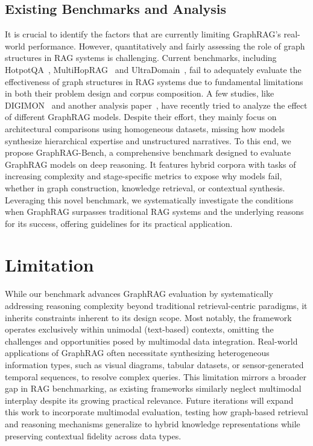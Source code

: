 \documentclass{article} %
\begin{document}
\subsection{Existing Benchmarks and Analysis}
It is crucial to identify the factors that are currently limiting GraphRAG's real-world performance.
However, quantitatively and fairly assessing the role of graph structures in RAG systems is challenging.
Current benchmarks, including HotpotQA~\citep{yang2018hotpotqa}, MultiHopRAG~\citep{tang2024multihop} and UltraDomain~\citep{qian2024memorag}, fail to adequately evaluate the effectiveness of graph structures in RAG systems due to fundamental limitations in both their problem design and corpus composition. A few studies, like DIGIMON~\citep{zhou2025depth} and another analysis paper~\citep {han2025rag}, have recently tried to analyze the effect of different GraphRAG models. Despite their effort, they mainly focus on architectural comparisons using homogeneous datasets, missing how models synthesize hierarchical expertise and unstructured narratives. To this end, we propose GraphRAG-Bench, a comprehensive benchmark designed to evaluate GraphRAG models on deep reasoning.  It features hybrid corpora with tasks of increasing complexity and stage-specific metrics to expose why models fail, whether in graph construction, knowledge retrieval, or contextual synthesis.
Leveraging this novel benchmark, we systematically investigate the conditions when GraphRAG surpasses traditional RAG systems and the underlying reasons for its success, offering guidelines for its practical application. 

\section{Limitation}
While our benchmark advances GraphRAG evaluation by systematically addressing reasoning complexity beyond traditional retrieval-centric paradigms, it inherits constraints inherent to its design scope. Most notably, the framework operates exclusively within unimodal (text-based) contexts, omitting the challenges and opportunities posed by multimodal data integration. Real-world applications of GraphRAG often necessitate synthesizing heterogeneous information types, such as visual diagrams, tabular datasets, or sensor-generated temporal sequences, to resolve complex queries. This limitation mirrors a broader gap in RAG benchmarking, as existing frameworks similarly neglect multimodal interplay despite its growing practical relevance. Future iterations will expand this work to incorporate multimodal evaluation, testing how graph-based retrieval and reasoning mechanisms generalize to hybrid knowledge representations while preserving contextual fidelity across data types.
\end{document}
